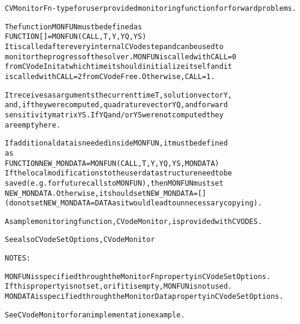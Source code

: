 \begin{alltt}
CVMonitorFn - type for user provided monitoring function for forward problems.

   The function MONFUN must be defined as
       FUNCTION [] = MONFUN(CALL, T, Y, YQ, YS)
   It is called after every internal CVode step and can be used to
   monitor the progress of the solver. MONFUN is called with CALL=0
   from CVodeInit at which time it should initialize itself and it
   is called with CALL=2 from CVodeFree. Otherwise, CALL=1.

   It receives as arguments the current time T, solution vector Y,
   and, if they were computed, quadrature vector YQ, and forward 
   sensitivity matrix YS. If YQ and/or YS were not computed they
   are empty here.

   If additional data is needed inside MONFUN, it must be defined
   as
      FUNCTION NEW_MONDATA = MONFUN(CALL, T, Y, YQ, YS, MONDATA)
   If the local modifications to the user data structure need to be 
   saved (e.g. for future calls to MONFUN), then MONFUN must set
   NEW_MONDATA. Otherwise, it should set NEW_MONDATA=[] 
   (do not set NEW_MONDATA = DATA as it would lead to unnecessary copying).

   A sample monitoring function, CVodeMonitor, is provided with CVODES.

   See also CVodeSetOptions, CVodeMonitor

   NOTES:

   MONFUN is specified through the MonitorFn property in CVodeSetOptions.
   If this property is not set, or if it is empty, MONFUN is not used.
   MONDATA is specified through the MonitorData property in CVodeSetOptions.

   See CVodeMonitor for an implementation example.
\end{alltt}






\vspace{0.1in}